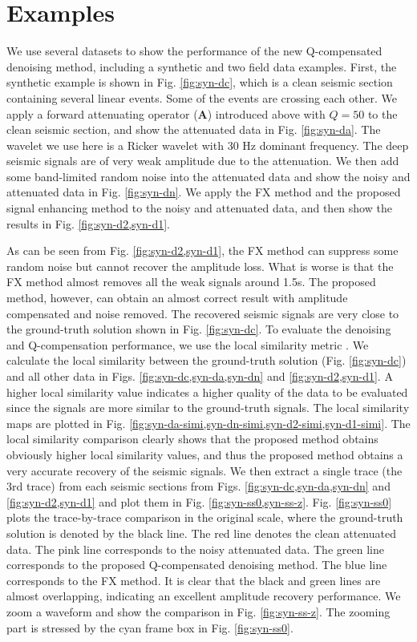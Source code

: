 \section{Examples}
We use several datasets to show the performance of the new Q-compensated denoising method, including a synthetic and two field data examples. First, the synthetic example is shown in Fig. \ref{fig:syn-dc}, which is a clean seismic section containing several linear events. Some of the events are crossing each other. We apply a forward attenuating operator ($\mathbf{A}$) introduced above with $Q=50$ to the clean seismic section, and show the attenuated data in Fig. \ref{fig:syn-da}. The wavelet we use here is a Ricker wavelet with 30 Hz dominant frequency. The deep seismic signals are of very weak amplitude due to the attenuation. We then add some band-limited random noise into the attenuated data and show the noisy and attenuated data in Fig. \ref{fig:syn-dn}. We apply the FX method \cite{canales1984} and the proposed signal enhancing method to the noisy and attenuated data, and then show the results in Fig. \ref{fig:syn-d2,syn-d1}. 

As can be seen from Fig. \ref{fig:syn-d2,syn-d1}, the FX method can suppress some random noise but cannot recover the amplitude loss. What is worse is that the FX method almost removes all the weak signals around 1.5s. The proposed method, however, can obtain an almost correct result with amplitude compensated and noise removed. The recovered seismic signals are very close to the ground-truth solution shown in Fig. \ref{fig:syn-dc}. To evaluate the denoising and Q-compensation performance, we use the local similarity metric \cite{fomel2007localattr,yangkang2015ortho}. We calculate the local similarity between the ground-truth solution (Fig. \ref{fig:syn-dc}) and all other data in Figs. \ref{fig:syn-dc,syn-da,syn-dn} and \ref{fig:syn-d2,syn-d1}. A higher local similarity value indicates a higher quality of the data to be evaluated since the signals are more similar to the ground-truth signals. The local similarity maps are plotted in Fig. \ref{fig:syn-da-simi,syn-dn-simi,syn-d2-simi,syn-d1-simi}. The local similarity comparison clearly shows that the proposed method obtains obviously higher local similarity values, and thus the proposed method obtains a very accurate recovery of the seismic signals. We then extract a single trace (the 3rd trace) from each seismic sections from Figs. \ref{fig:syn-dc,syn-da,syn-dn} and \ref{fig:syn-d2,syn-d1} and plot them in Fig. \ref{fig:syn-ss0,syn-ss-z}. Fig. \ref{fig:syn-ss0} plots the trace-by-trace comparison in the original scale, where the ground-truth solution is denoted by the black line. The red line denotes the clean attenuated data. The pink line corresponds to the noisy attenuated data.  The green line corresponds to the proposed Q-compensated denoising method. The blue line corresponds to the FX method. It is clear that the black and green lines are almost overlapping, indicating an excellent amplitude recovery performance. We zoom a waveform and show the comparison in Fig. \ref{fig:syn-ss-z}. The zooming part is stressed by the cyan frame box in Fig. \ref{fig:syn-ss0}. 

